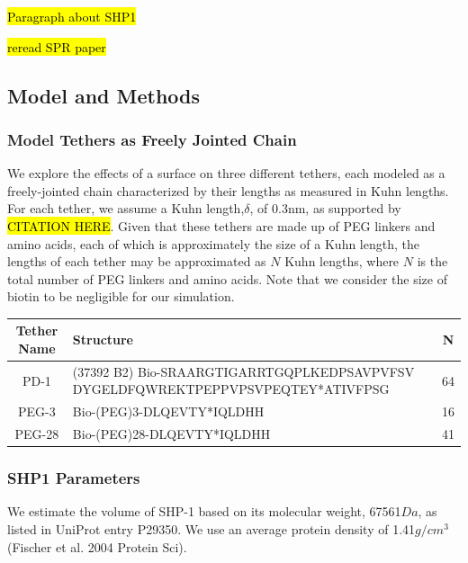 \documentclass[../../AdvancementSummary.tex]{subfiles}
\begin{document}
\hl{Paragraph about SHP1}

\hl{reread SPR paper} 


\subsection{Model and Methods}
\subsubsection{Model Tethers as Freely Jointed Chain}

We explore the effects of a surface on three different tethers, each modeled as a freely-jointed chain characterized by their lengths as measured in Kuhn lengths.  For each tether, we assume a Kuhn length,$\delta$, of 0.3nm, as supported by \hl{CITATION HERE}. Given that these tethers are made up of PEG linkers and amino acids, each of which is approximately the size of a Kuhn length, the lengths of each tether may be approximated as $N$ Kuhn lengths, where $N$ is the total number of PEG linkers and amino acids. Note that we consider the size of biotin to be negligible for our simulation.



\begin{center}
\begin{tabular}{| c | p{10cm} | c |}
    \hline
        Tether Name & Structure & N \\ 
        \hline 
        PD-1    &   (37392 B2) Bio-SRAARGTIGARRTGQPLKEDPSAVPVFSV
                    DYGELDFQWREKTPEPPVPSVPEQTEY*ATIVFPSG            &   64   \\
        PEG-3   &   Bio-(PEG)3-DLQEVTY*IQLDHH                           &   16   \\ 
        PEG-28  &   Bio-(PEG)28-DLQEVTY*IQLDHH                          &   41   \\
    \hline
\end{tabular}
\end{center}

\subsubsection{SHP1 Parameters}

We estimate the volume of SHP-1 based on its molecular weight, 67561$Da$,  as listed in UniProt entry P29350. We use an average protein density of 1.41$g/cm^3$ (Fischer et al. 2004 Protein Sci).

\end{document}
